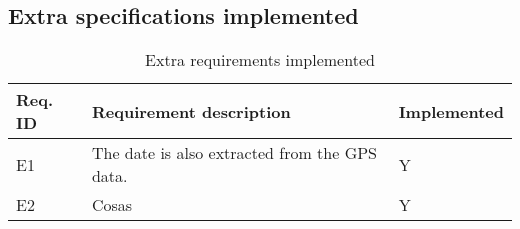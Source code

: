 \subsection{Extra specifications implemented}
\begin{table}[H]
    \begin{center}
        \begin{tabular}{p{} | p{} | p{}}
            Req. ID & Requirement description & Implemented\\
            \hline
            E1 & The date is also extracted from the GPS data. & Y\\
            \hline
            E2 & Cosas & Y\\
            \hline
        \end{tabular} 
    \end{center}
    \caption{Extra requirements implemented}
    \label{ReqExtra}
\end{table}